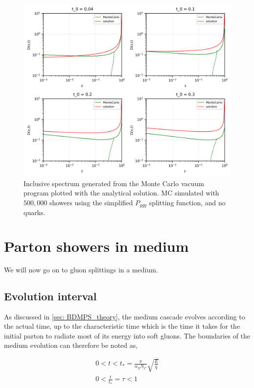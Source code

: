 \documentclass[main.tex]{subfiles}
\begin{document}
\begin{figure}[ht]
    \centering
    \includegraphics[width=12cm]{pictures/distributions/vacuum_shower_simple_ggg_500k_minz0_MCandAnalytical.png}
    \caption{Inclusive spectrum generated from the Monte Carlo vacuum program plotted with the analytical solution. MC simulated with \(500,000\) showers using the simplified \(P_{ggg}\) splitting function, and no quarks.}
    \label{fig: vacuum_MCandAnalytical_comparison}
\end{figure}


\newpage
\section{Parton showers in medium}
We will now go on to gluon splittings in a medium. 

\subsection{Evolution interval}
As discussed in \autoref{sec: BDMPS_theory}, the medium cascade evolves according to the actual time, up to the characteristic time which is the time it takes for the initial parton to radiate most of its energy into soft gluons. The boundaries of the medium evolution can therefore be noted as, 

\begin{align}\label{eqn: medium_evolution_boundaries}
    0 < t < t_* = \frac{\pi}{\alpha_S N_C} \sqrt{\frac{E}{\hat q}} \nonumber \\
    0 < \frac{t}{t_*} = \tau < 1
\end{align}
\end{document}
